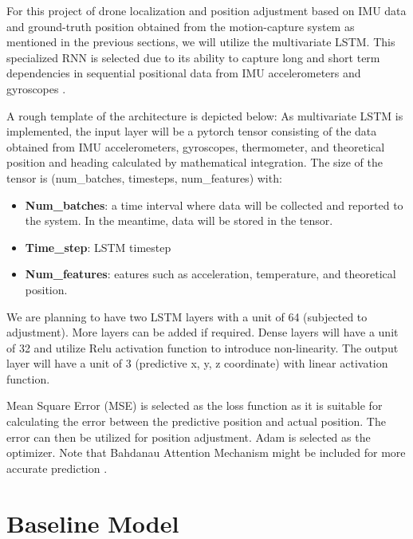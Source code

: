 \documentclass{article} %
\begin{document}
For this project of drone localization and position adjustment based on IMU data and ground-truth position obtained from the motion-capture system as mentioned in the previous sections, we will utilize the multivariate LSTM. This specialized RNN is selected due to its ability to capture long and short term dependencies in sequential positional data from IMU accelerometers and gyroscopes \citep{zh_d2l_lstm}.


A rough template of the architecture is depicted below: As multivariate LSTM is implemented, the input layer will be a pytorch tensor consisting of the data obtained from IMU accelerometers, gyroscopes, thermometer, and theoretical position and heading calculated by mathematical integration. The size of the tensor is (num{\_}batches, timesteps, num{\_}features) with:

\begin{itemize}
  \item \textbf{Num{\_}batches}: a time interval where data will be collected and reported to the system. In the meantime, data will be stored in the tensor.
  \item \textbf{Time{\_}step}: LSTM timestep
  \item \textbf{Num{\_}features}: eatures such as acceleration, temperature, and theoretical position.
\end{itemize}




We are planning to have two LSTM layers with a unit of 64 (subjected to adjustment). More layers can be added if required. Dense layers will have a unit of 32 and utilize Relu activation function to introduce non-linearity. The output layer will have a unit of 3 (predictive x, y, z coordinate) with linear activation function. 

Mean Square Error (MSE) is selected as the loss function as it is suitable for calculating the error between the predictive position and actual position. The error can then be utilized for position adjustment. Adam is selected as the optimizer. Note that Bahdanau Attention Mechanism might be included for more accurate prediction \citep{d2l_bahdanau_attention}.


\section{Baseline Model}
\end{document}
